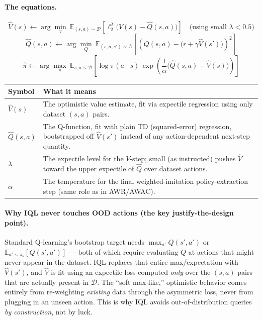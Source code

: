 \documentclass[11pt]{article}
\begin{document}
\paragraph{The equations.}
$$\hat V(s) \leftarrow \arg\min_V\ \mathbb{E}_{(s,a)\sim\mathcal{D}}\left[\ell_2^\lambda
\big(V(s) - \hat Q(s,a)\big)\right] \quad\text{(using small } \lambda<0.5\text{)}$$
$$\hat Q(s,a) \leftarrow \arg\min_Q\ \mathbb{E}_{(s,a,s')\sim\mathcal{D}}\left[\left(Q(s,a) -
\big(r + \gamma \hat V(s')\big)\right)^2\right]$$
$$\hat\pi \leftarrow \arg\max_\pi\ \mathbb{E}_{s,a\sim\mathcal{D}}\left[\log \pi(a\mid s)\,
\exp\left(\frac{1}{\alpha}\big(\hat Q(s,a) - \hat V(s)\big)\right)\right]$$

\begin{center}
\begin{tabular}{@{}p{3.2cm}p{10.3cm}@{}}
\toprule
Symbol & What it means \\
\midrule
$\hat V(s)$ & The optimistic value estimate, fit via expectile regression using only
dataset $(s,a)$ pairs. \\
$\hat Q(s,a)$ & The Q-function, fit with plain TD (squared-error) regression, bootstrapped
off $\hat V(s')$ instead of any action-dependent next-step quantity. \\
$\lambda$ & The expectile level for the $V$-step; small (as instructed) pushes $\hat V$
toward the upper expectile of $\hat Q$ over dataset actions. \\
$\alpha$ & The temperature for the final weighted-imitation policy-extraction step
(same role as in AWR/AWAC). \\
\bottomrule
\end{tabular}
\end{center}

\paragraph{Why IQL never touches OOD actions (the key justify-the-design point).}
Standard Q-learning's bootstrap target needs $\max_{a'} Q(s',a')$ or
$\mathbb{E}_{a'\sim\pi_\theta}[Q(s',a')]$ --- both of which require evaluating $Q$ at
actions that might never appear in the dataset. IQL replaces that entire
max/expectation with $\hat V(s')$, and $\hat V$ is fit using an expectile loss computed
\emph{only} over the $(s,a)$ pairs that are actually present in $\mathcal{D}$. The
``soft max-like,'' optimistic behavior comes entirely from re-weighting
\emph{existing} data through the asymmetric loss, never from plugging in an unseen
action. This is why IQL avoids out-of-distribution queries \emph{by construction}, not
by luck.
\end{document}
